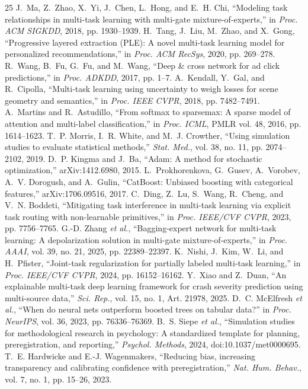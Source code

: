 \documentclass[9pt, conference, a4paper, compsocconf]{IEEEtran}
\begin{document}
\begin{thebibliography}{25}
 J.~Ma, Z.~Zhao, X.~Yi, J.~Chen, L.~Hong, and E.~H. Chi, ``Modeling task relationships in multi-task learning with multi-gate mixture-of-experts,'' in \emph{Proc. ACM SIGKDD}, 2018, pp. 1930--1939.
 H.~Tang, J.~Liu, M.~Zhao, and X.~Gong, ``Progressive layered extraction (PLE): A novel multi-task learning model for personalized recommendations,'' in \emph{Proc. ACM RecSys}, 2020, pp. 269--278.
 R.~Wang, B.~Fu, G.~Fu, and M.~Wang, ``Deep \& cross network for ad click predictions,'' in \emph{Proc. ADKDD}, 2017, pp. 1--7.
 A.~Kendall, Y.~Gal, and R.~Cipolla, ``Multi-task learning using uncertainty to weigh losses for scene geometry and semantics,'' in \emph{Proc. IEEE CVPR}, 2018, pp. 7482--7491.
 A.~Martins and R.~Astudillo, ``From softmax to sparsemax: A sparse model of attention and multi-label classification,'' in \emph{Proc. ICML}, PMLR vol. 48, 2016, pp. 1614--1623.
 T.~P. Morris, I.~R. White, and M.~J. Crowther, ``Using simulation studies to evaluate statistical methods,'' \emph{Stat. Med.}, vol. 38, no. 11, pp. 2074--2102, 2019.
 D.~P. Kingma and J.~Ba, ``Adam: A method for stochastic optimization,'' arXiv:1412.6980, 2015.
 L.~Prokhorenkova, G.~Gusev, A.~Vorobev, A.~V. Dorogush, and A.~Gulin, ``CatBoost: Unbiased boosting with categorical features,'' arXiv:1706.09516, 2017.
 C.~Ding, Z.~Lu, S.~Wang, R.~Cheng, and V.~N. Boddeti, ``Mitigating task interference in multi-task learning via explicit task routing with non-learnable primitives,'' in \textit{Proc. IEEE/CVF CVPR}, 2023, pp. 7756--7765.
 G.-D. Zhang \textit{et al.}, ``Bagging-expert network for multi-task learning: A depolarization solution in multi-gate mixture-of-experts,'' in \textit{Proc. AAAI}, vol. 39, no. 21, 2025, pp. 22389--22397.
 K.~Nishi, J.~Kim, W.~Li, and H.~Pfister, ``Joint-task regularization for partially labeled multi-task learning,'' in \textit{Proc. IEEE/CVF CVPR}, 2024, pp. 16152--16162.
 Y.~Xiao and Z.~Duan, ``An explainable multi-task deep learning framework for crash severity prediction using multi-source data,'' \textit{Sci. Rep.}, vol. 15, no. 1, Art. 21978, 2025.
 D.~C. McElfresh \textit{et al.}, ``When do neural nets outperform boosted trees on tabular data?'' in \textit{Proc. NeurIPS}, vol. 36, 2023, pp. 76336--76369.
 B.~S. Siepe \textit{et al.}, ``Simulation studies for methodological research in psychology: A standardized template for planning, preregistration, and reporting,'' \textit{Psychol. Methods}, 2024, doi:10.1037/met0000695.
 T.~E. Hardwicke and E.-J. Wagenmakers, ``Reducing bias, increasing transparency and calibrating confidence with preregistration,'' \textit{Nat. Hum. Behav.}, vol. 7, no. 1, pp. 15--26, 2023.
\end{thebibliography}
\end{document}
